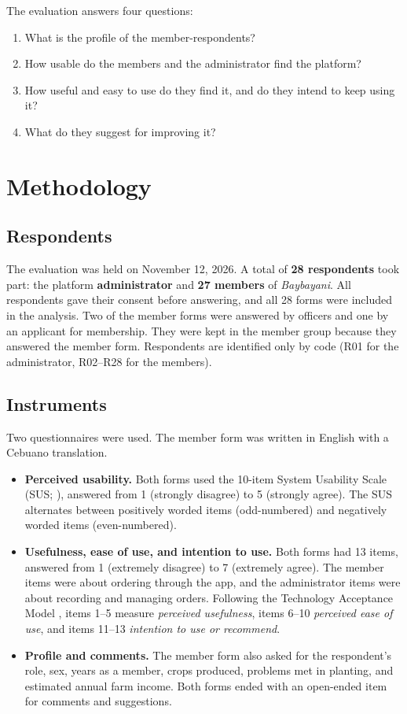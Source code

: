 \documentclass[11pt,a4paper]{article}
\begin{document}
The evaluation answers four questions:
\begin{enumerate}
  \item What is the profile of the member-respondents?
  \item How usable do the members and the administrator find the platform?
  \item How useful and easy to use do they find it, and do they intend to keep using it?
  \item What do they suggest for improving it?
\end{enumerate}

\section{Methodology}

\subsection{Respondents}
The evaluation was held on November 12, 2026. A total of \textbf{28 respondents} took part: the platform \textbf{administrator} and \textbf{27 members} of \textit{Baybayani}. All respondents gave their consent before answering, and all 28 forms were included in the analysis. Two of the member forms were answered by officers and one by an applicant for membership. They were kept in the member group because they answered the member form. Respondents are identified only by code (R01 for the administrator, R02--R28 for the members).

\subsection{Instruments}
Two questionnaires were used. The member form was written in English with a Cebuano translation.
\begin{itemize}
  \item \textbf{Perceived usability.} Both forms used the 10-item System Usability Scale (SUS; \citealt{brooke1996}), answered from 1 (strongly disagree) to 5 (strongly agree). The SUS alternates between positively worded items (odd-numbered) and negatively worded items (even-numbered).
  \item \textbf{Usefulness, ease of use, and intention to use.} Both forms had 13 items, answered from 1 (extremely disagree) to 7 (extremely agree). The member items were about ordering through the app, and the administrator items were about recording and managing orders. Following the Technology Acceptance Model \citep{davis1989}, items 1--5 measure \textit{perceived usefulness}, items 6--10 \textit{perceived ease of use}, and items 11--13 \textit{intention to use or recommend}.
  \item \textbf{Profile and comments.} The member form also asked for the respondent's role, sex, years as a member, crops produced, problems met in planting, and estimated annual farm income. Both forms ended with an open-ended item for comments and suggestions.
\end{itemize}
\end{document}
